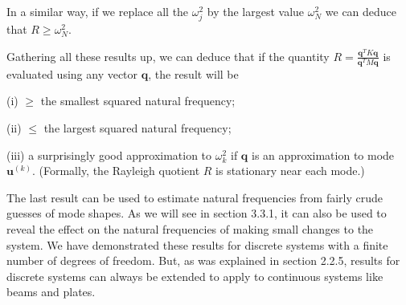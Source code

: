   In a similar way, if we replace all the $\omega_j^2$ by the largest value 
  $\omega_N^2$ we can deduce that $R \ge \omega_N^2$. 

  Gathering all these results up, we can deduce that if the quantity 
  $R=\frac{\mathbf{q}^T K \mathbf{q}}{\mathbf{q}^T M \mathbf{q}}$ is evaluated 
  using any vector $\mathbf{q}$, the result will be 

  (i) $\ge$ the smallest squared natural frequency; 

  (ii) $\le$ the largest squared natural frequency; 

  (iii) a surprisingly good approximation to $\omega_k^2$ if $\mathbf{q}$ is an 
  approximation to mode $\mathbf{u}^{(k)}$. (Formally, the Rayleigh quotient 
  $R$ is stationary near each mode.) 

  The last result can be used to estimate natural frequencies from fairly crude 
  guesses of mode shapes. As we will see in section 3.3.1, it can also be used 
  to reveal the effect on the natural frequencies of making small changes to 
  the system. We have demonstrated these results for discrete systems with a 
  finite number of degrees of freedom. But, as was explained in section 2.2.5, 
  results for discrete systems can always be extended to apply to continuous 
  systems like beams and plates. 